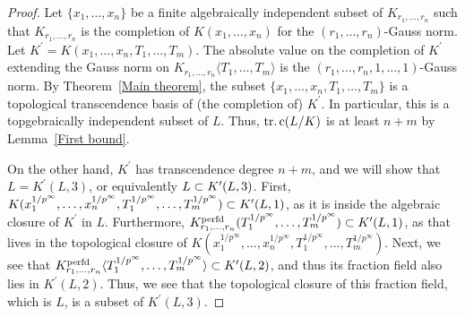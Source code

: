 \begin{proof}
    Let $\{x_1,\dots, x_n\}$ be a finite algebraically independent subset of $K_{r_1,\dots, r_n}$ such that $K_{r_1,\dots, r_n}$ is the completion of $K(x_1,\dots, x_n)$ for the $(r_1,\dots, r_n)$-Gauss norm. Let \(K^{\prime} = K(x_{1}, \ldots, x_{n}, T_{1}, \ldots, T_{m})\). The absolute value on the completion of $K^{\prime}$ extending the Gauss norm on $K_{r_1,\dots, r_n}\langle T_1,\dots, T_m\rangle$ is the $(r_1,\dots, r_n, 1, \dots, 1)$-Gauss norm.  
    By Theorem~\ref{Main theorem}, the subset $\{x_1,\dots, x_n, T_1,\dots, T_m\}$ is a topological transcendence basis of (the completion of) $K^{\prime}$. 
    In particular, this is a
    topgebraically independent subset of \(L\).
    Thus, \(\operatorname{tr.c}(L / K)\) is at least \(n + m\)
    by Lemma~\ref{First bound}.
    
    On the other hand, \(K^{\prime}\) has transcendence degree \(n+m\),
    and we will show that \(L = K^{\prime}(L,3)\), or
    equivalently \(L \subset K^{\prime}(L,3)\).
    First, 
    \(K(x_{1}^{1 / p^{\infty}}, \ldots, x_{n}^{1 / p^{\infty}}, T_{1}^{1 / p^{\infty}}, \ldots,
    T_{m}^{1 / p^{\infty}}) \subset K^{\prime}(L,1)\), 
    as it is inside the algebraic closure of \(K^{\prime}\) in \(L\).
    Furthermore, 
    \(K_{r_{1}, \ldots, r_{n}}^{\operatorname{perfd}}(T_{1}^{1 / p^{\infty}}, \ldots, T_{m}^{1 / p^{\infty}}) \subset
    K^{\prime}(L,1)\),
    as that lives in the topological closure of 
    \(K(x_{1}^{1 / p^{\infty}}, \ldots, x_{n}^{1 / p^{\infty}}, T_{1}^{1 / p^{\infty}}, \ldots,
    T_{m}^{1 / p^{\infty}})\).
    Next, 
    we see that 
    \(K_{r_{1}, \ldots, r_{n}}^{\operatorname{perfd}}\langle T_{1}^{1 / p^{\infty}}, \ldots, T_{m}^{1 / p^{\infty}}\rangle
    \subset K^{\prime}(L,2)\), 
    and thus its fraction field also lies in \(K^{\prime}(L,2)\).
    Thus, we see that the topological closure of this fraction
    field, which is \(L\), is a subset of \(K^{\prime}(L,3)\).
\end{proof}



